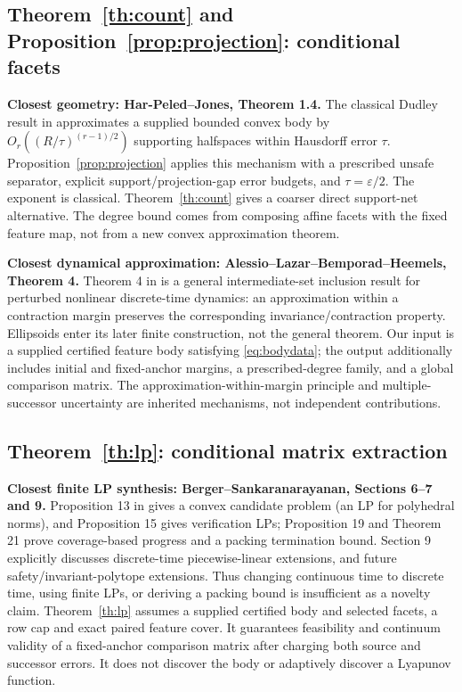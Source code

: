 \documentclass[10pt,letterpaper]{article}
\theoremstyle{remark}
\begin{document}
\subsection{Theorem~\ref{th:count} and Proposition~\ref{prop:projection}: conditional facets}
\textbf{Closest geometry: Har-Peled--Jones, Theorem 1.4.}
The classical Dudley result in \cite{harpeled} approximates a supplied bounded
convex body by $O_r((R/\tau)^{(r-1)/2})$ supporting halfspaces within
Hausdorff error $\tau$. Proposition~\ref{prop:projection} applies this mechanism
with a prescribed unsafe separator, explicit support/projection-gap error
budgets, and $\tau=\varepsilon/2$. The exponent is classical.
Theorem~\ref{th:count} gives a coarser direct support-net alternative.
The degree bound comes from composing affine facets with the fixed feature map,
not from a new convex approximation theorem.

\textbf{Closest dynamical approximation: Alessio--Lazar--Bemporad--Heemels, Theorem 4.}
Theorem 4 in \cite{alessio} is a general intermediate-set inclusion result for
perturbed nonlinear discrete-time dynamics: an approximation within a
contraction margin preserves the corresponding invariance/contraction property.
Ellipsoids enter its later finite construction, not the general theorem.
Our input is a supplied certified feature body satisfying \eqref{eq:bodydata};
the output additionally includes initial and fixed-anchor margins, a
prescribed-degree family, and a global comparison matrix.
The approximation-within-margin principle and multiple-successor uncertainty
are inherited mechanisms, not independent contributions.

\subsection{Theorem~\ref{th:lp}: conditional matrix extraction}
\textbf{Closest finite LP synthesis: Berger--Sankaranarayanan, Sections 6--7 and 9.}
Proposition 13 in \cite{berger} gives a convex candidate problem (an LP for
polyhedral norms), and Proposition 15 gives verification LPs; Proposition 19 and Theorem 21 prove
coverage-based progress and a packing termination bound.
Section 9 explicitly discusses discrete-time piecewise-linear extensions,
and future safety/invariant-polytope extensions.
Thus changing continuous time to discrete time, using finite LPs, or deriving
a packing bound is insufficient as a novelty claim.
Theorem~\ref{th:lp} assumes a supplied certified body and selected facets,
a row cap and exact paired feature cover. It guarantees feasibility and
continuum validity of a fixed-anchor comparison matrix after charging both
source and successor errors. It does not discover the body or adaptively
discover a Lyapunov function.
\end{document}
